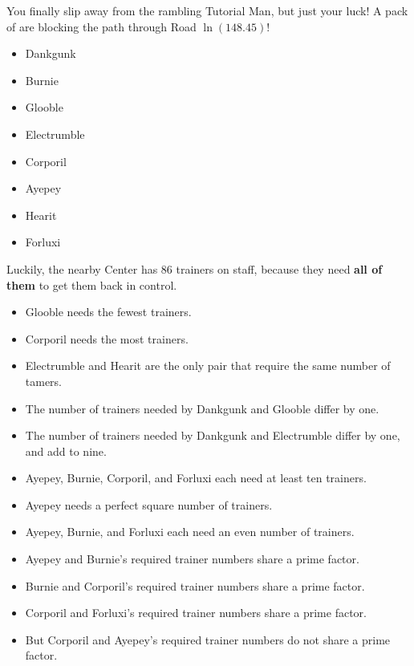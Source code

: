 

You finally slip away from the rambling Tutorial Man, but just your luck!
A pack of \mappMobimon{} are blocking the path
through Road \(\ln(148.45)\)!

\begin{multicols}{2}
\begin{itemize}
  \item {Dankgunk}
  \item {Burnie}
  \item {Glooble}
  \item {Electrumble}
  \item {Corporil}
  \item {Ayepey}
  \item {Hearit}
  \item {Forluxi}
\end{itemize}
\end{multicols}

Luckily, the nearby \mappMobimon{} Center has 86 trainers on staff,
because they need \textbf{all of them} to get them back in control.

\begin{multicols}{2}
\begin{itemize}
\item Glooble needs the fewest trainers.
\item Corporil needs the most trainers.
\item Electrumble and Hearit are the only pair that require
      the same number of tamers.
\item The number of trainers needed by Dankgunk and Glooble differ by one.
\item The number of trainers needed by Dankgunk and Electrumble differ by one,
      and add to nine.
\item Ayepey, Burnie, Corporil, and Forluxi each need at least ten
      trainers.
\item Ayepey needs a perfect square number of trainers.
\item Ayepey, Burnie, and Forluxi each need an even number of trainers.
\item Ayepey and Burnie's required trainer numbers share a prime factor.
\item Burnie and Corporil's required trainer numbers share a prime factor.
\item Corporil and Forluxi's required trainer numbers share a prime factor.
\item But Corporil and Ayepey's required trainer numbers do not
      share a prime factor.
\end{itemize}
\end{multicols}

